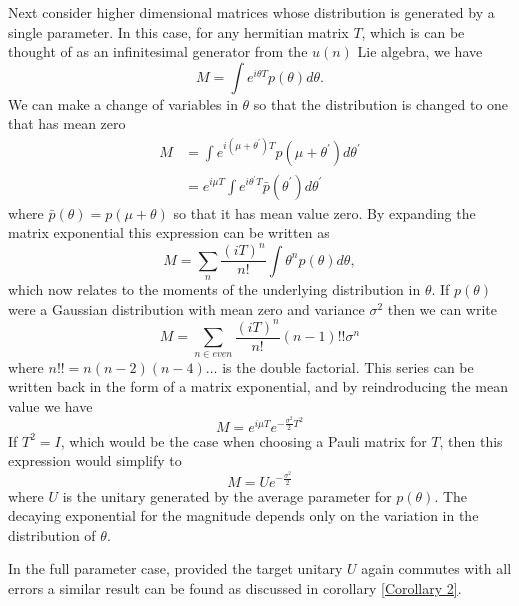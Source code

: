 \documentclass[aps,pra,twocolumn,superscriptaddress,numerical,floatfix]{revtex4-1}
\begin{document}
Next consider higher dimensional matrices whose distribution is generated by a single parameter.  In this case, for any hermitian matrix $T$, which is can be thought of as an infinitesimal generator from the $u(n)$ Lie algebra, we have
\begin{equation}
	M=\int e^{i\theta T}p(\theta)d\theta 
	\label{eq:single parameter, multi-mode}.
\end{equation}
We can make a change of variables in $\theta$ so that the distribution is changed to one that has mean zero
\begin{align}
	M&=\int e^{i(\mu + \theta^\prime)T} p(\mu + \theta^\prime) d\theta^\prime\\
	&= e^{i\mu T} \int e^{i\theta^\prime T} \bar{p}(\theta^\prime) d\theta^\prime
\end{align}
where $\bar{p}(\theta) = p(\mu + \theta)$ so that it has mean value zero.  By expanding the matrix exponential this expression can be written as
\begin{equation}
	M=\sum_n \frac{(iT)^n}{n!} \int \theta^n p(\theta) d\theta,
\end{equation}
which now relates to the moments of the underlying distribution in $\theta$. If $p(\theta)$ were a Gaussian distribution with mean zero and variance $\sigma^2$ then we can write
\begin{equation}
	M = \sum_{n \in even} \frac{(iT)^n}{n!} (n-1)!! \sigma^n
\end{equation}
where $n!! = n(n-2)(n-4)\dots$ is the double factorial.  This series can be written back in the form of a matrix exponential, and by reindroducing the mean value we have
\begin{equation}
	M = e^{i\mu T} e^{-\frac{\sigma^2}{2} T^2}
\end{equation}
If $T^2=I$, which would be the case when choosing a Pauli matrix for $T$, then this expression would simplify to
\begin{equation}
M=Ue^{-\frac{\sigma^2}{2}}  \label{eq:Gaussian Psuccess}
\end{equation}
where $U$ is the unitary generated by the average parameter for $p(\theta)$.  The decaying exponential for the magnitude depends only on the variation in the distribution of $\theta$.

In the full parameter case, provided the target unitary $U$ again commutes with all errors a similar result can be found as discussed in corollary \ref{Corollary 2}.
\end{document}
